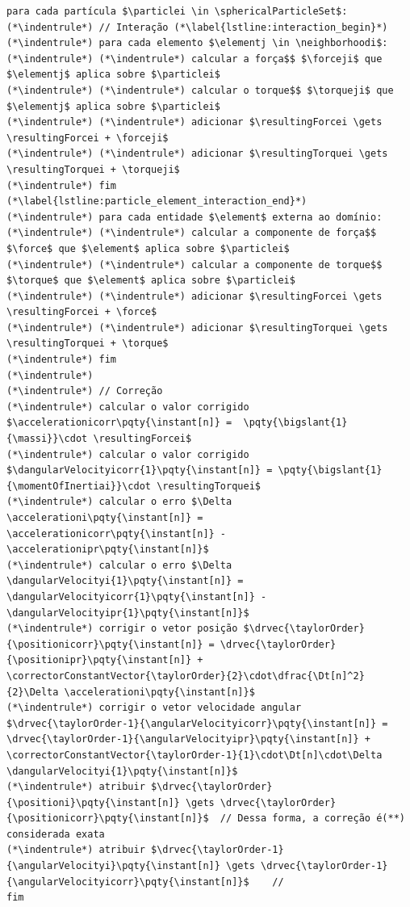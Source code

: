 \begin{lstlisting}[float, floatplacement=h, language=pseudocode, label=lst:equations_solution, caption=Pseudocódigo para a solução das equações de movimento de partículas esféricas por meio do algoritmo de Gear.]
para cada partícula $\particlei \in \sphericalParticleSet$:
(*\indentrule*)	// Interação (*\label{lstline:interaction_begin}*)
(*\indentrule*)	para cada elemento $\elementj \in \neighborhoodi$:
(*\indentrule*)	(*\indentrule*)	calcular a força$$ $\forceji$ que $\elementj$ aplica sobre $\particlei$
(*\indentrule*)	(*\indentrule*)	calcular o torque$$ $\torqueji$ que $\elementj$ aplica sobre $\particlei$
(*\indentrule*)	(*\indentrule*)	adicionar $\resultingForcei \gets \resultingForcei + \forceji$
(*\indentrule*)	(*\indentrule*)	adicionar $\resultingTorquei \gets \resultingTorquei + \torqueji$
(*\indentrule*)	fim (*\label{lstline:particle_element_interaction_end}*)
(*\indentrule*)	para cada entidade $\element$ externa ao domínio:
(*\indentrule*)	(*\indentrule*)	calcular a componente de força$$ $\force$ que $\element$ aplica sobre $\particlei$
(*\indentrule*)	(*\indentrule*)	calcular a componente de torque$$ $\torque$ que $\element$ aplica sobre $\particlei$
(*\indentrule*)	(*\indentrule*)	adicionar $\resultingForcei \gets \resultingForcei + \force$
(*\indentrule*)	(*\indentrule*)	adicionar $\resultingTorquei \gets \resultingTorquei + \torque$
(*\indentrule*)	fim
(*\indentrule*)
(*\indentrule*)	// Correção
(*\indentrule*)	calcular o valor corrigido $\accelerationicorr\pqty{\instant[n]} =  \pqty{\bigslant{1}{\massi}}\cdot \resultingForcei$
(*\indentrule*)	calcular o valor corrigido $\dangularVelocityicorr{1}\pqty{\instant[n]} = \pqty{\bigslant{1}{\momentOfInertiai}}\cdot \resultingTorquei$
(*\indentrule*)	calcular o erro $\Delta \accelerationi\pqty{\instant[n]} = \accelerationicorr\pqty{\instant[n]} - \accelerationipr\pqty{\instant[n]}$
(*\indentrule*)	calcular o erro $\Delta \dangularVelocityi{1}\pqty{\instant[n]} = \dangularVelocityicorr{1}\pqty{\instant[n]} - \dangularVelocityipr{1}\pqty{\instant[n]}$
(*\indentrule*)	corrigir o vetor posição $\drvec{\taylorOrder}{\positionicorr}\pqty{\instant[n]} = \drvec{\taylorOrder}{\positionipr}\pqty{\instant[n]} + \correctorConstantVector{\taylorOrder}{2}\cdot\dfrac{\Dt[n]^2}{2}\Delta \accelerationi\pqty{\instant[n]}$
(*\indentrule*)	corrigir o vetor velocidade angular $\drvec{\taylorOrder-1}{\angularVelocityicorr}\pqty{\instant[n]} = \drvec{\taylorOrder-1}{\angularVelocityipr}\pqty{\instant[n]} + \correctorConstantVector{\taylorOrder-1}{1}\cdot\Dt[n]\cdot\Delta \dangularVelocityi{1}\pqty{\instant[n]}$
(*\indentrule*)	atribuir $\drvec{\taylorOrder}{\positioni}\pqty{\instant[n]} \gets \drvec{\taylorOrder}{\positionicorr}\pqty{\instant[n]}$	// Dessa forma, a correção é(**) considerada exata
(*\indentrule*)	atribuir $\drvec{\taylorOrder-1}{\angularVelocityi}\pqty{\instant[n]} \gets \drvec{\taylorOrder-1}{\angularVelocityicorr}\pqty{\instant[n]}$	//		
fim
\end{lstlisting}

